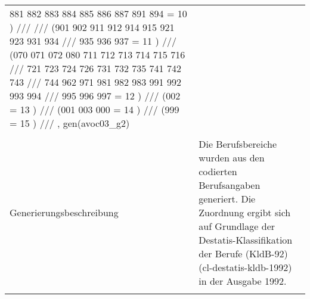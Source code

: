 \begin{tabular}{lL{11.3cm}}
881 882 883 884 885 886 887 891 894 = 10 ) ///  ///
(901 902 911 912 914 915 921 923 931 934 ///
935 936 937 = 11 ) ///
(070 071 072 080 711 712 713 714 715 716 ///
721 723 724 726 731 732 735 741 742 743 ///
744 962 971 981 982 983 991 992 993 994 ///
995 996 997 = 12 ) ///
(002 = 13 ) ///
(001 003 000 = 14 ) ///
(999 = 15 ) ///
, gen(avoc03\_g2) 
 \\
				 \\
					Generierungsbeschreibung & Die Berufsbereiche wurden aus den codierten Berufsangaben generiert. Die Zuordnung ergibt sich auf Grundlage der Destatis-Klassifikation der Berufe (KldB-92) (cl-destatis-kldb-1992) in der Ausgabe 1992. 
				 \\	
			 \\
		\end{tabular}






